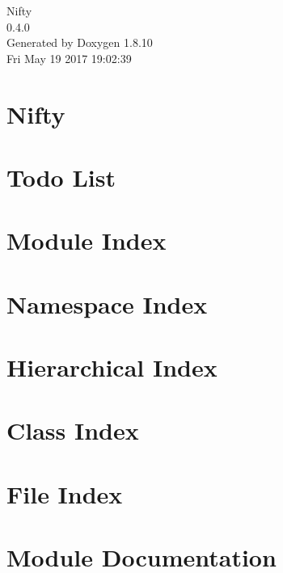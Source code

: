\documentclass[twoside]{book}
\newcommand{\+}{\discretionary{\mbox{\scriptsize$\hookleftarrow$}}{}{}}
\newcommand{\clearemptydoublepage}{%
  \newpage{\pagestyle{empty}\cleardoublepage}%
}
\begin{document}
\hypersetup{pageanchor=false,
             bookmarks=true,
             bookmarksnumbered=true,
             pdfencoding=unicode
            }
\begin{titlepage}
\vspace*{7cm}
\begin{center}%
{\Large Nifty \\[1ex]\large 0.\+4.\+0 }\\
\vspace*{1cm}
{\large Generated by Doxygen 1.8.10}\\
\vspace*{0.5cm}
{\small Fri May 19 2017 19:02:39}\\
\end{center}
\end{titlepage}
\clearemptydoublepage
\tableofcontents
\clearemptydoublepage
{}
\hypersetup{pageanchor=true}

\chapter{Nifty}
\label{index}\hypertarget{index}{}
\chapter{Todo List}
\label{todo}
\hypertarget{todo}{}

\chapter{Module Index}

\chapter{Namespace Index}

\chapter{Hierarchical Index}

\chapter{Class Index}

\chapter{File Index}

\chapter{Module Documentation}

\end{document}
